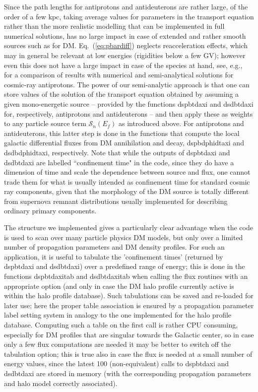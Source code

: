 \documentclass[a4paper,10pt,oneside]{book}
\newcommand{\code}[1]{\ft{#1}}
\newcommand{\ft}[1]{\textsf{#1}}
\begin{document}
Since the path lengths for antiprotons and antideuterons are rather large, of the order of a few kpc, taking average
values for parameters in the transport equation rather than the more realistic modelling that can be implemented
in full numerical solutions, has no large impact in case of extended and rather 
smooth sources such as for DM. 
Eq.~(\ref{eq:pbardiff}) neglects reacceleration effects, which may in general be relevant at low energies
(rigidities below a few GV); however even this does not have a large impact in case of the species at hand,
see, e.g.,~\cite{Evoli:2011id} for a comparison of results with numerical and semi-analytical solutions for cosmic-ray
antiprotons. The power of our semi-analytic approach is that one can store values of 
the solution of the transport equation obtained by assuming 
a given mono-energetic source -- provided by 
the functions \code{dspbtdaxi} and \code{dsdbtdaxi} for, respectively, antiprotons and antideuterons -- and 
then apply these as weights to any particle source term $\mathcal{S}_n(E_f)$ as introduced above.
For antiprotons and antideuterons, this latter step is done in the functions that compute the local galactic differential 
fluxes from DM annihilation and decay, \code{dspbdphidtaxi} and \code{dsdbdphidtaxi}, respectively.
Note that while the outputs of \code{dspbtdaxi} and \code{dsdbtdaxi}  are labelled ``confinement time" in the code,
since they do have a dimension of time and scale the dependence between source and flux, one cannot trade
them for what is usually intended as confinement time for standard cosmic ray components, given that the
morphology of the DM source is totally different from supernova remnant distributions usually implemented
for describing ordinary primary components.

The structure we implemented gives a particularly clear advantage when the code is used to scan over many 
particle physics DM models, but only over a limited number of propagation parameters and DM density profiles.
For such an application,  it is useful to tabulate the 'confinement times' (returned by \code{dspbtdaxi} and 
\code{dsdbtdaxi}) over a predefined range of energy; this is
done in the functions \code{dspbtdaxitab} and \code{dsdbtdaxitab} when calling the flux routines with an appropriate
option (and only in case the DM halo profile currently active is within the halo profile database). 
Such tabulations  can be saved and re-loaded for later use; 
here the proper table association is ensured by 
a propagation parameter label setting system in analogy to the one implemented for the halo profile database. 
Computing such a table on the first call is rather CPU  consuming, especially for DM profiles that are 
singular towards the Galactic center, so in case only a few flux
computations are needed it may be better to switch off the tabulation option; this is true also in case the flux is
needed at a small number of energy values, since the latest 100 (non-equivalent) calls to  
\code{dspbtdaxi} and \code{dsdbtdaxi}
are stored in memory (with the corresponding propagation parameters and halo model correctly associated).
\end{document}
